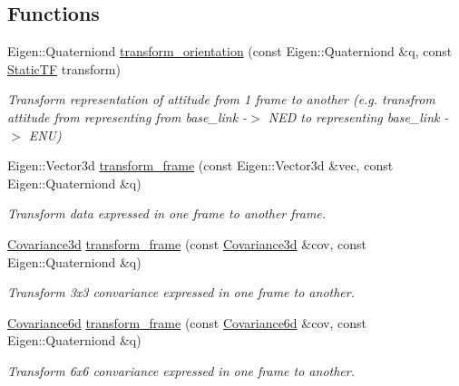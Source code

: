 \subsection*{Functions}
\begin{DoxyCompactItemize}
\item 
Eigen\+::\+Quaterniond \mbox{\hyperlink{group__nodelib_gaf97e6d622ff4f400e54ebcdae75407ef}{transform\+\_\+orientation}} (const Eigen\+::\+Quaterniond \&q, const \mbox{\hyperlink{group__nodelib_gacff0983128574bbbe115917b13e57a63}{Static\+TF}} transform)
\begin{DoxyCompactList}\small\item\em Transform representation of attitude from 1 frame to another (e.\+g. transfrom attitude from representing from base\+\_\+link -\/$>$ N\+ED to representing base\+\_\+link -\/$>$ E\+NU) \end{DoxyCompactList}\item 
Eigen\+::\+Vector3d \mbox{\hyperlink{group__nodelib_ga30dfcfe08b7c490b12664624277d2fe6}{transform\+\_\+frame}} (const Eigen\+::\+Vector3d \&vec, const Eigen\+::\+Quaterniond \&q)
\begin{DoxyCompactList}\small\item\em Transform data expressed in one frame to another frame. \end{DoxyCompactList}\item 
\mbox{\hyperlink{group__nodelib_ga56776cc8f5410a6bfeafa085fcd6fe30}{Covariance3d}} \mbox{\hyperlink{group__nodelib_ga767c8e2dd868f4d8bbd78c38662a17bb}{transform\+\_\+frame}} (const \mbox{\hyperlink{group__nodelib_ga56776cc8f5410a6bfeafa085fcd6fe30}{Covariance3d}} \&cov, const Eigen\+::\+Quaterniond \&q)
\begin{DoxyCompactList}\small\item\em Transform 3x3 convariance expressed in one frame to another. \end{DoxyCompactList}\item 
\mbox{\hyperlink{group__nodelib_gadc24a922dd3f6a7ff0d7aed9bda42bca}{Covariance6d}} \mbox{\hyperlink{group__nodelib_ga266710bc46b4a6e376a609c4486d39cb}{transform\+\_\+frame}} (const \mbox{\hyperlink{group__nodelib_gadc24a922dd3f6a7ff0d7aed9bda42bca}{Covariance6d}} \&cov, const Eigen\+::\+Quaterniond \&q)
\begin{DoxyCompactList}\small\item\em Transform 6x6 convariance expressed in one frame to another. \end{DoxyCompactList}\item 

\end{DoxyCompactItemize}
